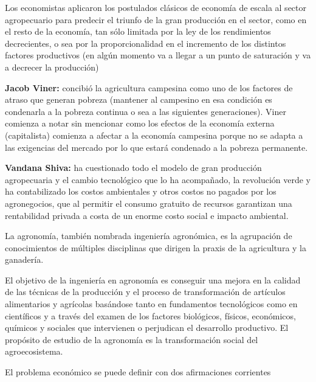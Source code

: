\documentclass[
  a4paper,
]{article}
\begin{document}
Los economistas aplicaron los postulados clásicos de economía de escala
al sector agropecuario para predecir el triunfo de la gran producción en
el sector, como en el resto de la economía, tan sólo limitada por la ley
de los rendimientos decrecientes, o sea por la proporcionalidad en el
incremento de los distintos factores productivos (en algún momento va a
llegar a un punto de saturación y va a decrecer la producción)

\textbf{Jacob Viner:} concibió la agricultura campesina como uno de los
factores de atraso que generan pobreza (mantener al campesino en esa
condición es condenarla a la pobreza continua o sea a las siguientes
generaciones). Viner comienza a notar sin mencionar como los efectos de
la economía externa (capitalista) comienza a afectar a la economía
campesina porque no se adapta a las exigencias del mercado por lo que
estará condenado a la pobreza permanente.

\textbf{Vandana Shiva:} ha cuestionado todo el modelo de gran producción
agropecuaria y el cambio tecnológico que lo ha acompañado, la revolución
verde y ha contabilizado los costos ambientales y otros costos no
pagados por los agronegocios, que al permitir el consumo gratuito de
recursos garantizan una rentabilidad privada a costa de un enorme costo
social e impacto ambiental.

La agronomía, también nombrada ingeniería agronómica, es la agrupación
de conocimientos de múltiples disciplinas que dirigen la praxis de la
agricultura y la ganadería.

El objetivo de la ingeniería en agronomía es conseguir una mejora en la
calidad de las técnicas de la producción y el proceso de transformación
de artículos alimentarios y agrícolas basándose tanto en fundamentos
tecnológicos como en científicos y a través del examen de los factores
biológicos, físicos, económicos, químicos y sociales que intervienen o
perjudican el desarrollo productivo. El propósito de estudio de la
agronomía es la transformación social del agroecosistema.

El problema económico se puede definir con dos afirmaciones corrientes
\end{document}
